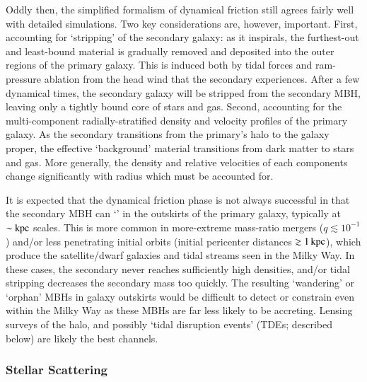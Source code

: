 \documentclass[onecolumn,authoryear]{els-mrw}
\begin{document}
Oddly then, the simplified formalism of dynamical friction still agrees fairly well with detailed simulations.  Two key considerations are, however, important.  First, accounting for `stripping' of the secondary galaxy: as it inspirals, the furthest-out and least-bound material is gradually removed and deposited into the outer regions of the primary galaxy.  This is induced both by tidal forces and ram-pressure ablation from the head wind that the secondary experiences.  After a few dynamical times, the secondary galaxy will be stripped from the secondary MBH, leaving only a tightly bound core of stars and gas.  Second, accounting for the multi-component radially-stratified density and velocity profiles of the primary galaxy.  As the secondary transitions from the primary's halo to the galaxy proper, the effective `background' material transitions from dark matter to stars and gas.  More generally, the density and relative velocities of each components change significantly with radius which must be accounted for.

It is expected that the dynamical friction phase is not always successful in that the secondary MBH can `' in the outskirts of the primary galaxy, typically at $\sim \mathrm{kpc}$ scales.  This is more common in more-extreme mass-ratio mergers ($q \lesssim 10^{-1}$) and/or less penetrating initial orbits (initial pericenter distances $\gtrsim 1 \, \mathrm{kpc}$), which produce the satellite/dwarf galaxies and tidal streams seen in the Milky Way.  In these cases, the secondary never reaches sufficiently high densities, and/or tidal stripping decreases the secondary mass too quickly.  The resulting `wandering' or `orphan' MBHs in galaxy outskirts would be difficult to detect or constrain even within the Milky Way as these MBHs are far less likely to be accreting.  Lensing surveys of the halo, and possibly `tidal disruption events' (TDEs; described below) are likely the best channels.

\subsubsection{Stellar Scattering}\label{sec:binary_evolution_scattering}
\end{document}
